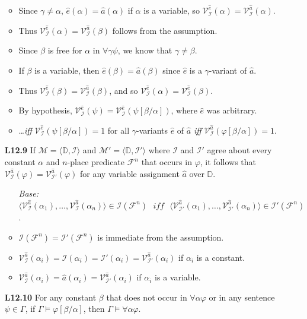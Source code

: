 \documentclass[a4paper, 11pt]{article} %
\newcommand{\tuple}[1]{\langle#1\rangle} %
\newcommand{\I}{\mathcal{I}}
\newcommand{\F}{\mathcal{F}}
\newcommand{\M}{\mathcal{M}}
\newcommand{\D}{\mathbb{D}}
\newcommand{\VV}[2]{\mathcal{V}_{#1}^{#2}} %
\newcommand{\va}[1]{\hat{#1}} %
\newcommand{\qt}[2]{#1 #2} %
\newcommand{\unisub}[2]{[#1/#2]}
\renewcommand{\models}{\vDash}
\def\metaA{\ensuremath{\varphi}}
\def\metaB{\ensuremath{\psi}}
\begin{document}
\begin{enumerate}[labelsep=.1in]
\begin{itemize}
      \item Since $\gamma\neq\alpha$, $\va{e}(\alpha)=\va{a}(\alpha)$ if $\alpha$ is a variable, so $\VV{\I}{\va{e}}(\alpha)=\VV{\I}{\va{a}}(\alpha)$. 
      \item Thus $\VV{\I}{\va{e}}(\alpha)=\VV{\I}{\va{a}}(\beta)$ follows from the assumption. 
      \item Since $\beta$ is free for $\alpha$ in $\qt{\forall}{\gamma}\metaB$, we know that $\gamma\neq\beta$.
      \item If $\beta$ is a variable, then $\va{e}(\beta)=\va{a}(\beta)$ since $\va{e}$ is a $\gamma$-variant of $\va{a}$.
      \item Thus $\VV{\I}{\va{e}}(\beta)=\VV{\I}{\va{a}}(\beta)$, and so $\VV{\I}{\va{e}}(\alpha)=\VV{\I}{\va{e}}(\beta)$.
      \item By hypothesis, $\VV{\I}{\va{e}}(\metaB)=\VV{\I}{\va{e}}(\metaB\unisub{\beta}{\alpha})$, where $\va{e}$ was arbitrary.
      \item \ldots\textit{iff} $\VV{\I}{\va{e}}(\metaB\unisub{\beta}{\alpha})=1$ for all $\gamma$-variants $\va{e}$ of $\va{a}$ \textit{iff} $\VV{\I}{\va{a}}(\metaA\unisub{\beta}{\alpha})=1$.
    \end{itemize}
  \item[\bf L12.9] If $\M=\tuple{\D,\I}$ and $\M'=\tuple{\D,\I'}$ where $\I$ and $\I'$ agree about every constant $\alpha$ and $n$-place predicate $\F^n$ that occurs in $\metaA$, it follows that $\VV{\I}{\va{a}}(\metaA)=\VV{\I'}{\va{a}}(\metaA)$ for any variable assignment $\va{a}$ over $\D$.
    \begin{itemize}
      \item[\it Base:] $\tuple{\VV{\I}{\va{a}}(\alpha_1),\ldots,\VV{\I}{\va{a}}(\alpha_n)}\in\I(\F^n) \textit{ ~iff~ } \tuple{\VV{\I'}{\va{a}}(\alpha_1),\ldots,\VV{\I'}{\va{a}}(\alpha_n)}\in\I'(\F^n)$.
      \item $\I(\F^n)=\I'(\F^n)$ is immediate from the assumption.
      \item $\VV{\I}{\va{a}}(\alpha_i)=\I(\alpha_i)=\I'(\alpha_i)=\VV{\I'}{\va{a}}(\alpha_i)$ if $\alpha_i$ is a constant.
      \item $\VV{\I}{\va{a}}(\alpha_i)=\va{a}(\alpha_i)=\VV{\I'}{\va{a}}(\alpha_i)$ if $\alpha_i$ is a variable.
    \end{itemize}
  \item[\bf L12.10] For any constant $\beta$ that does not occur in $\qt{\forall}{\alpha}\metaA$ or in any sentence $\metaB\in\Gamma$, if $\Gamma \models \metaA\unisub{\beta}{\alpha}$, then $\Gamma \models \qt{\forall}{\alpha}\metaA$.

\end{enumerate}
\end{document}
